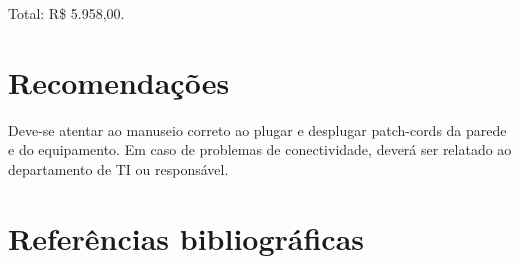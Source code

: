 \documentclass[	DIV=calc,%
							paper=a4,%
							fontsize=12pt,%
							onecolumn]{scrartcl}	 					%
\begin{document}
Total: R\$ 5.958,00.

\section{Recomendações}
Deve-se atentar ao manuseio correto ao plugar e desplugar patch-cords da parede e do equipamento. Em caso de problemas de conectividade, deverá ser relatado ao departamento de TI ou responsável.

\section{Referências bibliográficas}
\renewcommand\refname{} %

  
\end{document}
